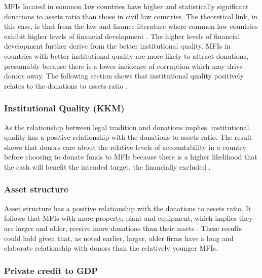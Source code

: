 \documentclass[a4paper, nobind]{templates/ociamthesis}
\begin{document}
MFIs located in common law countries have higher and statistically significant donations to assets ratio than those in civil law countries. The theoretical link, in this case, is that from the law and finance literature where common law countries exhibit higher levels of financial development \autocite{la2013law,schnyder2018twenty}. The higher levels of financial development further derive from the better institutional quality. MFIs in countries with better institutional quality are more likely to attract donations, presumably because there is a lower incidence of corruption which may drive donors away. The following section shows that institutional quality positively relates to the donations to assets ratio \autocite{huang2010political}.

\hypertarget{institutional-quality-kkm-2}{%
\subsubsection{Institutional Quality (KKM)}\label{institutional-quality-kkm-2}}

As the relationship between legal tradition and donations implies, institutional quality has a positive relationship with the donations to assets ratio. The result shows that donors care about the relative levels of accountability in a country before choosing to donate funds to MFIs because there is a higher likelihood that the cash will benefit the intended target, the financially excluded \autocite{kaufmann2011worldwide,huang2010political}.

\hypertarget{asset-structure-1}{%
\subsubsection{Asset structure}\label{asset-structure-1}}

Asset structure has a positive relationship with the donations to assets ratio. It follows that MFIs with more property, plant and equipment, which implies they are larger and older, receive more donations than their assets \autocite{cull2018microfinance}. These results could hold given that, as noted earlier, larger, older firms have a long and elaborate relationship with donors than the relatively younger MFIs.

\hypertarget{private-credit-to-gdp-1}{%
\subsubsection{Private credit to GDP}\label{private-credit-to-gdp-1}}
\end{document}
